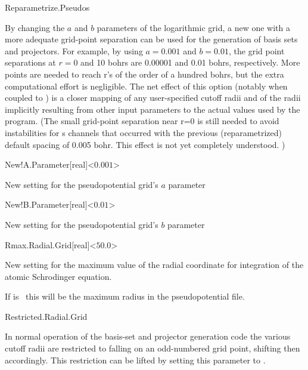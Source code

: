 \begin{fdflogicalF}{Reparametrize.Pseudos}

  By changing the $a$ and $b$ parameters of the logarithmic grid, a new
  one with a more adequate grid-point separation can be used for the
  generation of basis sets and projectors. For example, by using
  $a=0.001$ and $b=0.01$, the grid point separations at $r=0$ and 10
  bohrs are 0.00001 and 0.01 bohrs, respectively. More points are needed
  to reach r's of the order of a hundred bohrs, but the extra
  computational effort is negligible.  The net effect of this option
  (notably when coupled to  \fdffalse)
  is a closer mapping of any user-specified cutoff radii and of the
  radii implicitly resulting from other input parameters to the actual
  values used by the program. (The small grid-point separation near r=0
  is still needed to avoid instabilities for s channels that occurred
  with the previous (reparametrized) default spacing of 0.005 bohr. This
  effect is not yet completely understood. )

\end{fdflogicalF}

\begin{fdfentry}{New!A.Parameter}[real]<$0.001$>

  New setting for the pseudopotential grid's $a$ parameter

\end{fdfentry}

\begin{fdfentry}{New!B.Parameter}[real]<$0.01$>

  New setting for the pseudopotential grid's $b$ parameter

\end{fdfentry}

\begin{fdfentry}{Rmax.Radial.Grid}[real]<$50.0$>

  New setting for the maximum value of the radial coordinate for
  integration of the atomic Schrodinger equation.

  If  is \fdffalse\ this will be the
  maximum radius in the pseudopotential file.

\end{fdfentry}

\begin{fdflogicalT}{Restricted.Radial.Grid}

  In normal operation of the basis-set and projector generation code
  the various cutoff radii are restricted to falling on an
  odd-numbered grid point, shifting then accordingly. This restriction
  can be lifted by setting this parameter to \fdffalse.

\end{fdflogicalT}


